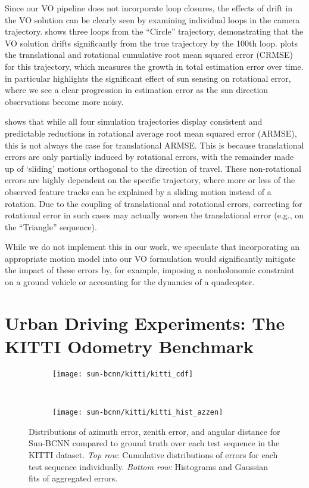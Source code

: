 Since our VO pipeline does not incorporate loop closures, the effects of drift in the VO solution can be clearly seen by examining individual loops in the camera trajectory. 
 shows three loops from the ``Circle'' trajectory, demonstrating that the VO solution drifts significantly from the true trajectory by the 100th loop.
 plots the translational and rotational cumulative root mean squared error (CRMSE) for this trajectory, which measures the growth in total estimation error over time.
 in particular highlights the significant effect of sun sensing on rotational error, where we see a clear progression in estimation error as the sun direction observations become more noisy.

 shows that while all four simulation trajectories display consistent and predictable reductions in rotational average root mean squared error (ARMSE), this is not always the case for translational ARMSE.
This is because translational errors are only partially induced by rotational errors, with the remainder made up of `sliding' motions orthogonal to the direction of travel.
These non-rotational errors are highly dependent on the specific trajectory, where more or less of the observed feature tracks can be explained by a sliding motion instead of a rotation.
Due to the coupling of translational and rotational errors, correcting for rotational error in such cases may actually worsen the translational error (e.g., on the ``Triangle'' sequence).

While we do not implement this in our work, we speculate that incorporating an appropriate motion model into our VO formulation would significantly mitigate the impact of these errors by, for example, imposing a nonholonomic constraint on a ground vehicle or accounting for the dynamics of a quadcopter.

\section{Urban Driving Experiments: The KITTI Odometry Benchmark}
\begin{figure}
    \centering
    \begin{subfigure}[b]{0.75\textwidth}
        \texttt{[image: sun-bcnn/kitti/kitti\_cdf]}
    \end{subfigure} ~
    \begin{subfigure}[b]{0.75\textwidth}
        \texttt{[image: sun-bcnn/kitti/kitti\_hist\_azzen]}
    \end{subfigure}
    \caption{Distributions of azimuth error, zenith error, and angular distance for Sun-BCNN compared to ground truth over each test sequence in the KITTI dataset. \emph{Top row}: Cumulative distributions of errors for each test sequence individually. \emph{Bottom row:} Histograms and Gaussian fits of aggregated errors.}
    \label{fig:sun-bcnn_kitti_cnn_testerrors}
\end{figure}

